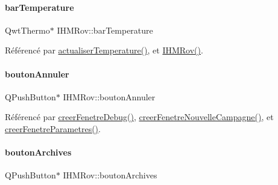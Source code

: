 \mbox{\label{class_i_h_m_rov_aa89397963e5889e2f911bed5112772cb}} 
\paragraph{\texorpdfstring{bar\+Temperature}{barTemperature}}
{\footnotesize\ttfamily Qwt\+Thermo$\ast$ I\+H\+M\+Rov\+::bar\+Temperature\hspace{0.3cm}{\ttfamily [private]}}



Référencé par \hyperlink{class_i_h_m_rov_ae5f2c89b06d7dc09e9974428b14799f1}{actualiser\+Temperature()}, et \hyperlink{class_i_h_m_rov_a5dac1fb4612866cc61f699a415e0ef6b}{I\+H\+M\+Rov()}.

\mbox{\label{class_i_h_m_rov_a4a6fec1b4a86c93c1d0d62d66804db5c}} 
\paragraph{\texorpdfstring{bouton\+Annuler}{boutonAnnuler}}
{\footnotesize\ttfamily Q\+Push\+Button$\ast$ I\+H\+M\+Rov\+::bouton\+Annuler\hspace{0.3cm}{\ttfamily [private]}}



Référencé par \hyperlink{class_i_h_m_rov_a30b49bada719a73e0899ad4bafb4de99}{creer\+Fenetre\+Debug()}, \hyperlink{class_i_h_m_rov_a08bf623a890df272f738c1ff8631213f}{creer\+Fenetre\+Nouvelle\+Campagne()}, et \hyperlink{class_i_h_m_rov_aed451139ac09ef18b7c92637761d80ce}{creer\+Fenetre\+Parametres()}.

\mbox{\label{class_i_h_m_rov_a1a0c3460e0b9e9c4a1adc54f7f229307}} 
\paragraph{\texorpdfstring{bouton\+Archives}{boutonArchives}}
{\footnotesize\ttfamily Q\+Push\+Button$\ast$ I\+H\+M\+Rov\+::bouton\+Archives\hspace{0.3cm}{\ttfamily [private]}}



